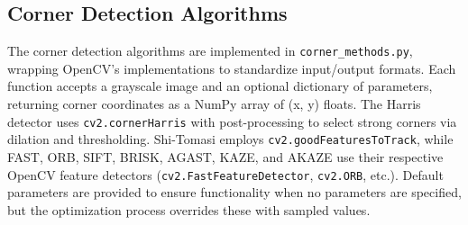 \documentclass[journal]{IEEEtran}
\begin{document}
\subsection{Corner Detection Algorithms}
The corner detection algorithms are implemented in \texttt{corner\_methods.py}, wrapping OpenCV’s implementations to standardize input/output formats. Each function accepts a grayscale image and an optional dictionary of parameters, returning corner coordinates as a NumPy array of (x, y) floats. The Harris detector uses \texttt{cv2.cornerHarris} with post-processing to select strong corners via dilation and thresholding. Shi-Tomasi employs \texttt{cv2.goodFeaturesToTrack}, while FAST, ORB, SIFT, BRISK, AGAST, KAZE, and AKAZE use their respective OpenCV feature detectors (\texttt{cv2.FastFeatureDetector}, \texttt{cv2.ORB}, etc.). Default parameters are provided to ensure functionality when no parameters are specified, but the optimization process overrides these with sampled values.\\
\end{document}
